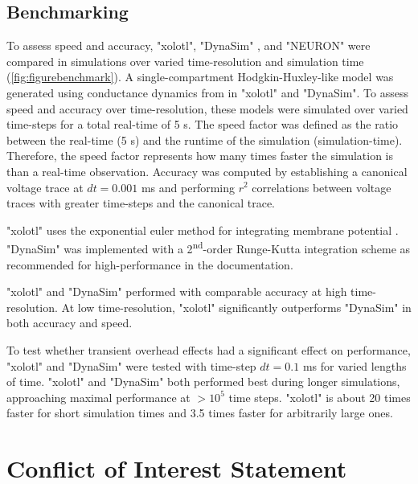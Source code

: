 \documentclass{frontiersSCNS} %
\begin{document}
\subsection{Benchmarking}

To assess speed and accuracy, "xolotl", "DynaSim" \autocite{sherfeyDynaSimMATLABToolbox2018}, and "NEURON" \autocite{hinesNEURONSimulationEnvironment1997} were compared in simulations over varied time-resolution and simulation time (\ref{fig:figurebenchmark}). A single-compartment Hodgkin-Huxley-like model was generated using conductance dynamics from \cite{liuModelNeuronActivitydependent1998} in "xolotl" and "DynaSim". To assess speed and accuracy over time-resolution, these models were simulated over varied time-steps for a total real-time of 5 s. The speed factor was defined as the ratio between the real-time (5 s) and the runtime of the simulation (simulation-time). Therefore, the speed factor represents how many times faster the simulation is than a real-time observation. Accuracy was computed by establishing a canonical voltage trace at $dt = 0.001$ ms and performing $r^2$ correlations between voltage traces with greater time-steps and the canonical trace.

"xolotl" uses the exponential euler method for integrating membrane potential \autocite{dayanTheoreticalNeuroscience2001}. "DynaSim" was implemented with a 2\textsuperscript{nd}-order Runge-Kutta integration scheme as recommended for high-performance in the documentation.

"xolotl" and "DynaSim" performed with comparable accuracy at high time-resolution. At low time-resolution, "xolotl" significantly outperforms "DynaSim" in both accuracy and speed.

To test whether transient overhead effects had a significant effect on performance, "xolotl" and "DynaSim" were tested with time-step $dt = 0.1$ ms for varied lengths of time. "xolotl" and "DynaSim" both performed best during longer simulations, approaching maximal performance at $>10^5$ time steps. "xolotl" is about 20 times faster for short simulation times and 3.5 times faster for arbitrarily large ones.

\section*{Conflict of Interest Statement}
\end{document}
